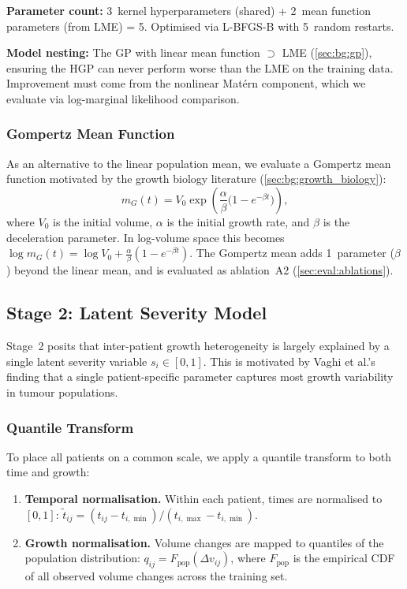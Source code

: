 \textbf{Parameter count:} 3~kernel hyperparameters (shared) + 2~mean
function parameters (from LME) = 5. Optimised via L-BFGS-B with 5~random
restarts.

\textbf{Model nesting:} The GP with linear mean function $\supset$ LME
(\cref{sec:bg:gp}), ensuring the HGP can never perform worse than the LME
on the training data. Improvement must come from the nonlinear Mat\'{e}rn
component, which we evaluate via log-marginal likelihood comparison.

\subsubsection{Gompertz Mean Function}

As an alternative to the linear population mean, we evaluate a Gompertz
mean function motivated by the growth biology literature
(\cref{sec:bg:growth_biology}):
\begin{equation}
  m_G(t) = V_0 \exp\!\left(\frac{\alpha}{\beta}
    \bigl(1 - e^{-\beta t}\bigr)\right),
  \label{eq:gompertz_mean}
\end{equation}
where $V_0$ is the initial volume, $\alpha$ is the initial growth rate,
and $\beta$ is the deceleration parameter. In log-volume space this becomes
$\log m_G(t) = \log V_0 + \frac{\alpha}{\beta}(1 - e^{-\beta t})$. The
Gompertz mean adds 1~parameter ($\beta$) beyond the linear mean, and is
evaluated as ablation~A2 (\cref{sec:eval:ablations}).

\subsection{Stage 2: Latent Severity Model}
\label{sec:growth:stage2}

Stage~2 posits that inter-patient growth heterogeneity is largely explained
by a single latent severity variable $s_i \in [0, 1]$. This is motivated by
Vaghi et al.'s \cite{vaghi2020reduced} finding that a single patient-specific
parameter captures most growth variability in tumour populations.

\subsubsection{Quantile Transform}

To place all patients on a common scale, we apply a quantile transform to
both time and growth:
\begin{enumerate}[leftmargin=*]
  \item \textbf{Temporal normalisation.} Within each patient, times are
    normalised to $[0, 1]$:
    $\tilde{t}_{ij} = (t_{ij} - t_{i,\min}) / (t_{i,\max} - t_{i,\min})$.
  \item \textbf{Growth normalisation.} Volume changes are mapped to
    quantiles of the population distribution:
    $q_{ij} = F_{\text{pop}}(\Delta v_{ij})$, where $F_{\text{pop}}$ is the
    empirical CDF of all observed volume changes across the training set.
\end{enumerate}


